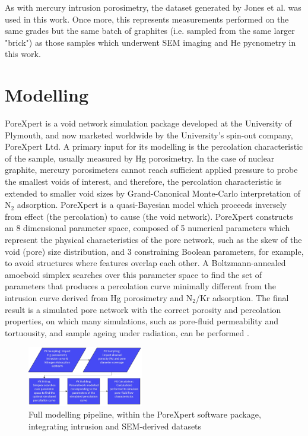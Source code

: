 \documentclass[3p,twocolumn]{elsarticle}
\begin{document}
As with mercury intrusion porosimetry, the dataset generated by Jones et al.
\citep{Jones2018} was used in this work. Once more, this represents measurements
performed on the same grades but the same batch of graphites (i.e. sampled from
the same larger "brick") as those samples which underwent SEM imaging and He
pycnometry in this work.

\section{Modelling}
PoreXpert is a void network simulation package developed at the University of
Plymouth, and now marketed worldwide by the University's spin-out company,
PoreXpert Ltd. A primary input for its modelling is the percolation
characteristic of the sample, usually measured by Hg porosimetry.  In the case
of nuclear graphite, mercury porosimeters cannot reach sufficient applied
pressure to probe the smallest voids of interest, and therefore, the percolation
characteristic is extended to smaller void sizes by Grand-Canonical Monte-Carlo
interpretation of N$_2$ adsorption.  PoreXpert is a quasi-Bayesian model which
proceeds inversely from effect (the percolation) to cause (the void network).
PoreXpert constructs an 8 dimensional parameter space,  composed of 5 numerical
parameters which represent the physical characteristics of the pore network,
such as the skew of the void (pore) size distribution, and 3 constraining
Boolean parameters, for example, to avoid structures where features overlap each
other. A Boltzmann-annealed amoeboid simplex searches over this parameter space
to find the set of parameters that produces a percolation curve minimally
different from the intrusion curve derived from Hg porosimetry and N$_2$/Kr
adsorption. The final result is a simulated pore network with the correct
porosity and percolation properties, on which many simulations, such as
pore-fluid permeability and tortuousity, and sample ageing under radiation, can
be performed \citep{MatthewsPoreXpert2025}.

\begin{figure}[!htbp]
    \centering
    \includegraphics[width=0.45\textwidth]{./Media/Modelling Pipeline.jpg.jpg}
    \caption{Full modelling pipeline, within the PoreXpert software package, integrating intrusion and SEM-derived datasets}
    \label{fig:modelling pipeline}
\end{figure}
\end{document}
